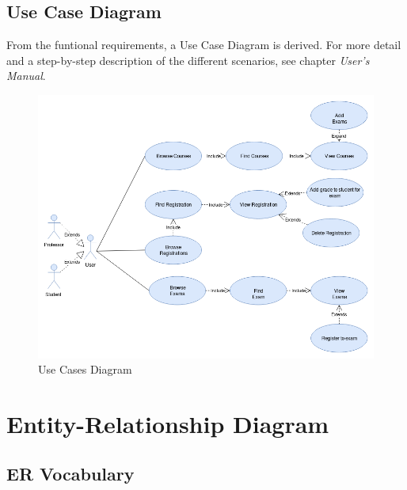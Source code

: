 \documentclass{report}
\begin{document}
\section*{Use Case Diagram}
From the funtional requirements, a Use Case Diagram is derived. For more detail and a step-by-step description of the different scenarios, see chapter \textit{User's Manual}.
\begin{figure}[ht]
	\includegraphics[width=1\textwidth]{UseCaseDiagram.png}
	\caption{Use Cases Diagram}
\end{figure}




\chapter*{Entity-Relationship Diagram}
\section*{ER Vocabulary}
\end{document}
